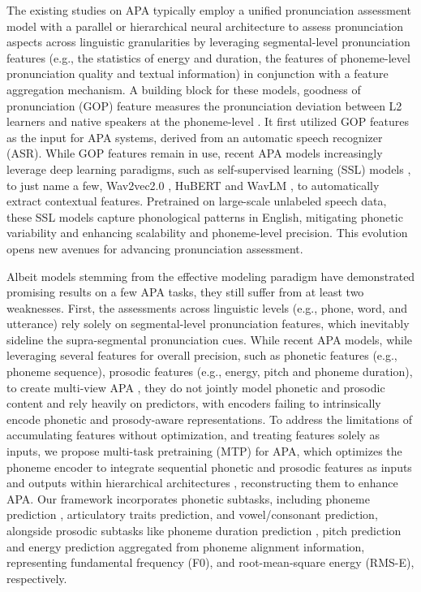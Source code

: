 \documentclass[conference,a4paper]{APSIPA2025}
\begin{document}
The existing studies on APA typically employ a unified pronunciation assessment model with a parallel \cite{9746743, chao20223m} or hierarchical \cite{10890778, chao23_interspeech, 10095733} neural architecture to assess pronunciation aspects across linguistic granularities by leveraging segmental-level pronunciation features (e.g., the statistics of energy and duration, the features of phoneme-level pronunciation quality and textual information) in conjunction with a feature aggregation mechanism. A building block for these models, goodness of pronunciation (GOP) feature measures the pronunciation deviation between L2 learners and native speakers at the phoneme-level \cite{9746743}. It first utilized GOP features as the input for APA systems, derived from an automatic speech recognizer (ASR). While GOP features remain in use, recent APA models increasingly leverage deep learning paradigms, such as self-supervised learning (SSL) models \cite{10890778, chao20223m, chao23_interspeech}, to just name a few, Wav2vec2.0 \cite{baevski2020wav2vec}, HuBERT \cite{hsu2021hubert} and WavLM \cite{9814838}, to automatically extract contextual features. Pretrained on large-scale unlabeled speech data, these SSL models capture phonological patterns in English, mitigating phonetic variability and enhancing scalability and phoneme-level precision. This evolution opens new avenues for advancing pronunciation assessment.

Albeit models stemming from the effective modeling paradigm have demonstrated promising results on a few APA tasks, they still suffer from at least two weaknesses. First, the assessments across linguistic levels (e.g., phone, word, and utterance) rely solely on segmental-level pronunciation features, which inevitably sideline the supra-segmental pronunciation cues. While recent APA models, while leveraging several features for overall precision, such as phonetic features (e.g., phoneme sequence), prosodic features (e.g., energy, pitch and phoneme duration), to create multi-view APA \cite{10890778, chao20223m, 10389777}, they do not jointly model phonetic and prosodic content and rely heavily on predictors, with encoders failing to intrinsically encode phonetic and prosody-aware representations. To address the limitations of accumulating features without optimization, and treating features solely as inputs, we propose multi-task pretraining (MTP) for APA, which optimizes the phoneme encoder to integrate sequential phonetic and prosodic features as inputs and outputs within hierarchical architectures \cite{10890778, 10389777}, reconstructing them to enhance APA. Our framework incorporates phonetic subtasks, including phoneme prediction \cite{jia21_interspeech, thenguyen23_interspeech, fu23_interspeech}, articulatory traits prediction, and vowel/consonant prediction, alongside prosodic subtasks like phoneme duration prediction \cite{fu23_interspeech}, pitch prediction and energy prediction aggregated from phoneme alignment information, representing fundamental frequency (F0), and root-mean-square energy (RMS-E), respectively.
\end{document}
